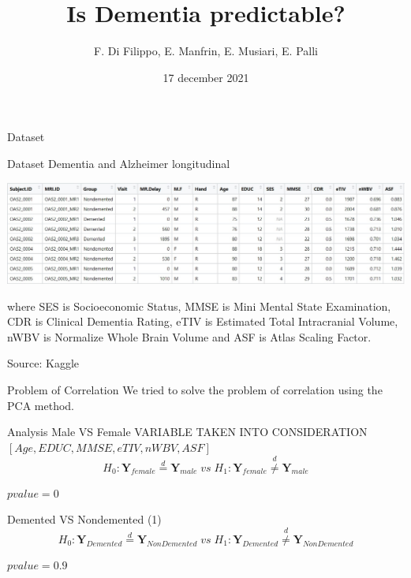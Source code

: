 \documentclass{beamer}
\title{Is Dementia predictable?}
\author{F. Di Filippo, E. Manfrin, E. Musiari, E. Palli}
\date{17 december 2021}
\begin{document}
	
	\begin{frame}
		\maketitle
	\end{frame}
	
	
	\begin{frame}{Dataset}
		
		Dataset Dementia and Alzheimer longitudinal
		\begin{center}
			
			
			\includegraphics[width=\columnwidth]{dataset_al.jpeg}
		\end{center}
		
		
		where SES is Socioeconomic Status, MMSE is Mini Mental State Examination, CDR is Clinical Dementia Rating, eTIV is Estimated Total Intracranial Volume, nWBV is Normalize Whole Brain Volume and ASF is Atlas Scaling Factor.
		
		\vspace{0.1 cm}
		Source: Kaggle
		
		
	\end{frame}
	
	\begin{frame}{Problem of Correlation}
		We tried to solve the problem of correlation using the PCA method.
		
	\end{frame}
	
	\begin{frame}{Analysis Male VS Female}
		VARIABLE TAKEN INTO CONSIDERATION	$[Age,EDUC,MMSE,eTIV,nWBV,ASF]$ 
	$$
	H_0: \mathbf{Y}_{female} \overset{d}{=} \mathbf{Y}_{male}\;vs\;H_1:\mathbf{Y}_{female} \overset{d}{\neq} \mathbf{Y}_{male}
	$$
	 
	$pvalue= 0 $
	\end{frame}
		\begin{frame}{Demented VS Nondemented (1) }
		$$
	H_0: \mathbf{Y}_{Demented} \overset{d}{=} \mathbf{Y}_{Non Demented}\;vs\;H_1:\mathbf{Y}_{Demented} \overset{d}{\neq} \mathbf{Y}_{Non Demented}
	$$
	
 	$pvalue= 0.9 $
	\end{frame}
	
\end{document}
